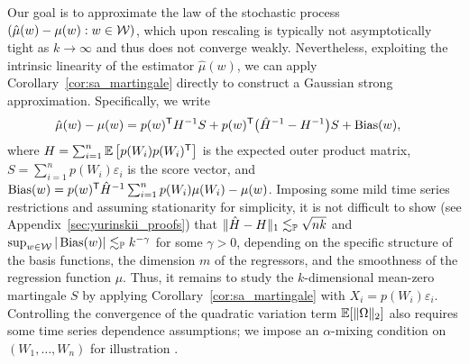 Our goal is to approximate the law of the stochastic process
$(\hat\mu(w)-\mu(w):w\in\cW)$, which upon rescaling is typically not
asymptotically tight as $k \to \infty$ and thus does not converge weakly.
Nevertheless, exploiting the intrinsic linearity of the estimator $\hat\mu(w)$,
we can apply Corollary~\ref{cor:sa_martingale} directly to construct a Gaussian
strong approximation. Specifically, we write
%
\begin{align*}
  \hat\mu(w) - \mu(w)
  &= p(w)^\T H^{-1} S
  + p(w)^\T \big(\hat H^{-1} - H^{-1}\big) S
  + \Bias(w),
\end{align*}
%
where $H= \sum_{i=1}^n \E\left[p(W_i) p(W_i)^\T\right]$
is the expected outer product matrix, $S = \sum_{i=1}^n p(W_i) \varepsilon_i$
is the score vector, and
$\Bias(w) = p(w)^{\T} \hat H^{-1}\sum_{i=1}^n p(W_i) \mu(W_i) - \mu(w)$.
Imposing some mild time series restrictions and assuming stationarity for
simplicity, it is not difficult to show
(see Appendix~\ref{sec:yurinskii_proofs})
that $\|\hat H - H\|_1 \lesssim_\P \sqrt{n k}$ and
$\sup_{w\in\cW} |\Bias(w)| \lesssim_\P k^{-\gamma}$
for some $\gamma>0$, depending on the specific structure of the basis
functions, the dimension $m$ of the regressors, and the smoothness of the
regression function $\mu$. Thus, it remains to study the $k$-dimensional
mean-zero martingale $S$ by applying Corollary~\ref{cor:sa_martingale} with
$X_i=p(W_i) \varepsilon_i$. Controlling the convergence of the quadratic
variation term $\E[\|\Omega\|_2]$ also requires some time series dependence
assumptions; we impose an $\alpha$-mixing condition on $(W_1, \ldots, W_n)$ for
illustration \citep{bradley2005basic}.

